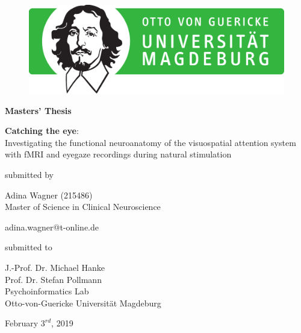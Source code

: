 \documentclass[a4paper, 11pt]{scrreprt}
\begin{document}

\begin{figure}[h]
\vspace{-1.5cm}
\hspace{9.5cm}
\includegraphics[scale=0.5]{img/ovgu_nat_logo}
\label{logoOVGU}
\end{figure}

\begin{center}
\bigskip
\begin{LARGE}
\textbf{Masters' Thesis}
\end{LARGE}

\vspace{\fill}

\begin{huge}
 
\textbf{Catching the eye}: \\
Investigating the functional neuroanatomy of the visuospatial attention system with fMRI and eyegaze recordings during natural stimulation

\end{huge}

\vspace{\fill}

submitted by\\
\begin{large}
Adina Wagner (215486) \\
\vspace{0.3cm}
Master of Science in Clinical Neuroscience\\
\begin{normalsize}
adina.wagner@t-online.de 
\end{normalsize}

\vspace{\fill}

\begin{normalsize}
submitted to\\
\end{normalsize}
J.-Prof. Dr. Michael Hanke\\
Prof. Dr. Stefan Pollmann\\
\vspace{0.5cm}
Psychoinformatics Lab\\
Otto-von-Guericke Universität Magdeburg\\
\end{large}

\vspace{1cm}

February $3^{rd}$, 2019

\thispagestyle{empty}
\end{center}
\clearpage
\end{document}

